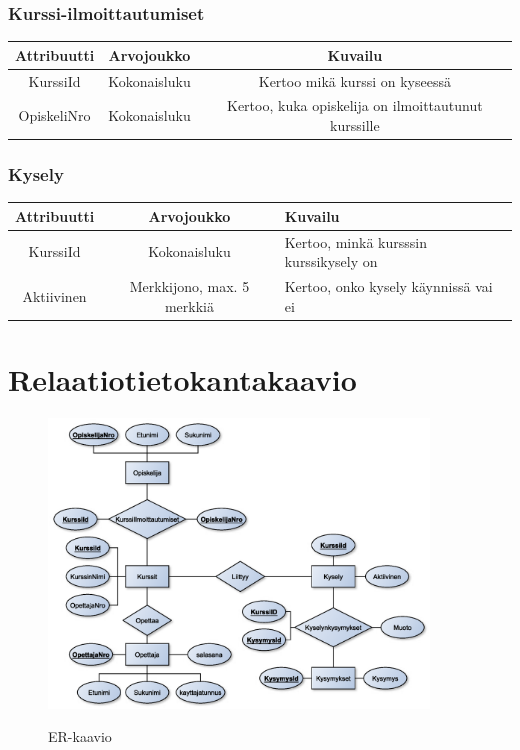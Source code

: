 \documentclass[12pt,twoside,a4paper,leqno,titlepage]{article}
\begin{document}
\subsubsection*{Kurssi-ilmoittautumiset}

\begin{tabular}{|c|c|c|}
  \hline
  \textbf{Attribuutti} & \textbf{Arvojoukko} & \textbf{Kuvailu} \\
  \hline
  KurssiId & Kokonaisluku & Kertoo mikä kurssi on kyseessä \\
  \hline
  OpiskeliNro & Kokonaisluku & Kertoo, kuka opiskelija on ilmoittautunut
  kurssille \\
  \hline
\end{tabular}

\subsubsection*{Kysely}

\begin{tabular}{|c|c|p{5cm}|}
  \hline
  \textbf{Attribuutti} & \textbf{Arvojoukko} & \textbf{Kuvailu} \\
  \hline
  KurssiId & Kokonaisluku & Kertoo, minkä kursssin kurssikysely on \\
  \hline
  Aktiivinen & Merkkijono, max. 5 merkkiä & Kertoo, onko kysely käynnissä vai ei \\
  \hline
\end{tabular}

\section{Relaatiotietokantakaavio}

\begin{figure}[!h]
  \centering
  \includegraphics[width=0.9\textwidth]{er-kaavio}\\
  \caption{ER-kaavio}
\end{figure}
\clearpage
\end{document}
